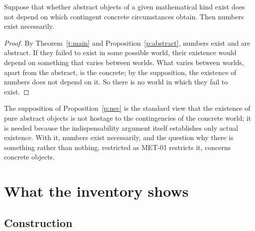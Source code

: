\documentclass{situationist-preprint}
\begin{document}
\begin{proposition}\label{p:nec}
Suppose that whether abstract objects of a given mathematical kind exist does not depend on which contingent concrete circumstances obtain. Then numbers exist necessarily.
\end{proposition}

\begin{proof}
By Theorem~\ref{t:main} and Proposition~\ref{p:abstract}, numbers exist and are abstract. If they failed to exist in some possible world, their existence would depend on something that varies between worlds. What varies between worlds, apart from the abstract, is the concrete; by the supposition, the existence of numbers does not depend on it. So there is no world in which they fail to exist.
\end{proof}

The supposition of Proposition~\ref{p:nec} is the standard view that the existence of pure abstract objects is not hostage to the contingencies of the concrete world; it is needed because the indispensability argument itself establishes only actual existence. With it, numbers exist necessarily, and the question why there is something rather than nothing, restricted as MET-01 restricts it, concerns concrete objects.

\section{What the inventory shows}\label{s:inv}

\subsection{Construction}
\end{document}
